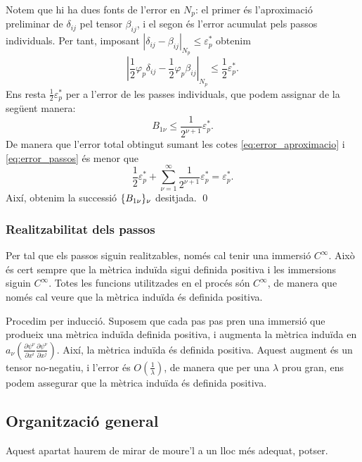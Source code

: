 {Notem que hi ha dues fonts de l'error en $N_p$: el primer és l'aproximació preliminar de $\delta_{ij}$ pel tensor $\beta_{ij}$, i el segon és l'error acumulat pels passos individuals. Per tant, imposant $|\delta_{ij}-\beta_{ij}|_{N_p} \le \varepsilon_p^*$ obtenim 
\begin{equation}\label{eq:error_aproximacio}
    \left|\frac12\varphi_p\delta_{ij}-\frac12\varphi_p\beta_{ij}\right|_{N_p} \le \frac12\varepsilon_p^*.
\end{equation}
Ens resta $\frac12\varepsilon_p^*$
per a l'error de les passes individuals, que podem assignar de la següent manera:
\begin{equation}\label{eq:error_passos}
    B_{1\nu} \le \frac{1}{2^{\nu+1}}\varepsilon_p^*.
\end{equation}
De manera que l'error total obtingut sumant les cotes \ref{eq:error_aproximacio} i \ref{eq:error_passos} és menor que
\begin{equation*}
    \frac12\varepsilon_p^* + \sum_{\nu=1}^\infty \frac1{2^{\nu+1}}\varepsilon_p^* = \varepsilon_p^*.
\end{equation*}
Així, obtenim la successió $\{B_{1\nu}\}_{\nu}$ desitjada.
\qed
}
\subsubsection{Realitzabilitat dels passos}
Per tal que els passos siguin realitzables, només cal tenir una immersió $C^\infty$. Això és cert sempre que la mètrica induïda sigui definida positiva i les immersions siguin $C^\infty$. Totes les funcions utilitzades en el procés són $C^\infty$, de manera que només cal veure que la mètrica induïda és definida positiva.

Procedim per inducció. Suposem que cada pas pas pren una immersió que produeix una mètrica induïda definida positiva, i augmenta la mètrica induïda en $a_\nu\left(\frac{\partial\psi^\nu}{\partial x^i}\frac{\partial\psi^\nu}{\partial x^j}\right)$. Així, la mètrica induïda és definida positiva. Aquest augment és un tensor no-negatiu, i l'error és $O\left(\frac1{\lambda}\right)$, de manera que per una $\lambda$ prou gran, ens podem assegurar que la mètrica induïda és definida positiva.

\subsection{Organització general}
{\color{blue} Aquest apartat haurem de mirar de moure'l a un lloc més adequat, potser. }

